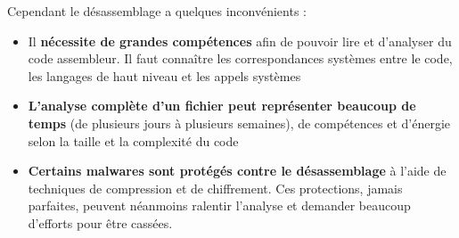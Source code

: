 Cependant le désassemblage a quelques inconvénients :\\

\begin{itemize}
\item Il  \textbf{nécessite de grandes compétences} afin de pouvoir lire et d'analyser du code assembleur. Il faut connaître les correspondances systèmes entre le code, les langages de haut niveau et les appels systèmes
\item \textbf{L'analyse complète d'un fichier peut représenter beaucoup de temps} (de plusieurs jours à plusieurs semaines), de compétences et d'énergie selon la taille et la complexité du code
\item \textbf{Certains malwares sont protégés contre le désassemblage} à l'aide de techniques de compression et de chiffrement. Ces protections, jamais parfaites, peuvent néanmoins ralentir l'analyse et demander beaucoup d'efforts pour être cassées.
\end{itemize}
